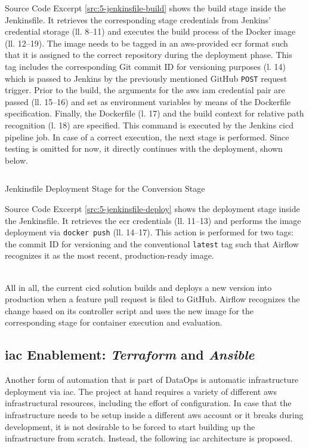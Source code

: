 Source Code Excerpt \ref{src:5-jenkinsfile-build} shows the build stage inside the Jenkinsfile. It retrieves the corresponding stage credentials from Jenkins' credential storage (ll. 8--11) and executes the build process of the Docker image (ll. 12--19). The image needs to be tagged in an \ac{aws}-provided \ac{ecr} format such that it is assigned to the correct repository during the deployment phase. This tag includes the corresponding Git commit ID for versioning purposes (l. 14) which is passed to Jenkins by the previously mentioned GitHub \texttt{POST} request trigger. Prior to the build, the arguments for the \ac{aws} \ac{iam} credential pair are passed (ll. 15--16) and set as environment variables by means of the Dockerfile specification. Finally, the Dockerfile (l. 17) and the build context for relative path recognition (l. 18) are specified. This command is executed by the Jenkins \ac{cicd} pipeline job. In case of a correct execution, the next stage is performed. Since testing is omitted for now, it directly continues with the deployment, shown below. 
\newpage
\begin{listing}[h!]
	\inputminted{groovy}{main-matter/src/5-jenkinsfile-deploy}
	\caption{Jenkinsfile Deployment Stage for the Conversion Stage}
	\label{src:5-jenkinsfile-deploy}
\end{listing}

Source Code Excerpt \ref{src:5-jenkinsfile-deploy} shows the deployment stage inside the Jenkinsfile. It retrieves the \ac{ecr} credentials (ll. 11--13) and performs the image deployment via \texttt{docker push} (ll. 14--17). This action is performed for two tags: the commit ID for versioning and the conventional \texttt{latest} tag such that Airflow recognizes it as the most recent, production-ready image. \\\

All in all, the current \ac{cicd} solution builds and deploys a new version into production when a feature pull request is filed to GitHub. Airflow recognizes the change based on its controller script and uses the new image for the corresponding stage for container execution and evaluation.

\subsection{\acs{iac} Enablement: \textit{Terraform} and \textit{Ansible}}
Another form of automation that is part of DataOps is automatic infrastructure deployment via \ac{iac}. The project at hand requires a variety of different \ac{aws} infrastructural resources, including the effort of configuration. In case that the infrastructure needs to be setup inside a different \ac{aws} account or it breaks during development, it is not desirable to be forced to start building up the infrastructure from scratch. Instead, the following \ac{iac} architecture is proposed.

